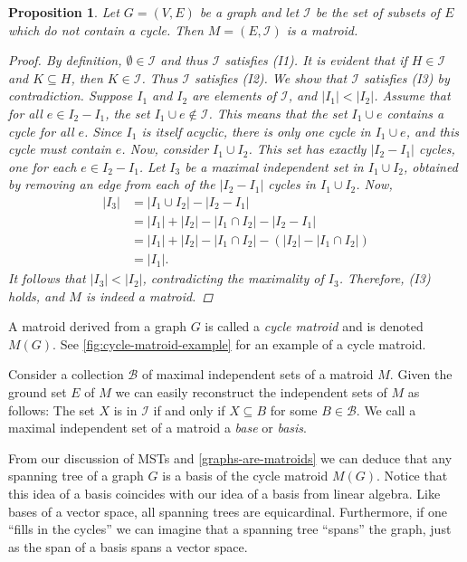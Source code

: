 \documentclass[a4paper,11pt]{report}
\theoremstyle{plain}
\newtheorem{prp}[prp]{Proposition}
\theoremstyle{definition}
\newcommand{\I}{\mathcal{I}}
\newcommand{\B}{\mathscr{B}}
\begin{document}
\begin{prp}\label{graphs-are-matroids}
Let $G = (V,E)$ be a graph and let $\I$ be the set of subsets of $E$ which
do not contain a cycle. Then $M = (E,\I)$ is a matroid.

\begin{proof}
By definition, $\emptyset \in \I$ and thus $\I$ satisfies (I1). It is evident
that if $H \in \I$ and $K \subseteq H$, then $K \in \I$. Thus $\I$ satisfies
(I2). We show that $\I$ satisfies (I3) by contradiction. Suppose $I_1$ and
$I_2$ are elements of $\I$, and $|I_1| < |I_2|$. Assume that for all $e \in
I_2 - I_1$, the set $I_1 \cup e \not\in \I$. This means that the set $I_1
\cup e$ contains a cycle for all $e$. Since $I_1$ is itself acyclic, there
is only one cycle in $I_1 \cup e$, and this cycle must contain $e$. Now,
consider $I_1 \cup I_2$. This set has exactly $|I_2 - I_1|$ cycles, one for
each $e \in I_2 - I_1$. Let $I_3$ be a maximal independent set in
$I_1 \cup I_2$, obtained by removing an edge from each of the $|I_2 - I_1|$
cycles in $I_1 \cup I_2$. Now,
\begin{align*}
    |I_3| &= |I_1 \cup I_2| - |I_2 - I_1|\\
    &= |I_1| + |I_2| - |I_1 \cap I_2| - |I_2 - I_1|\\
    &= |I_1| + |I_2| - |I_1 \cap I_2| - (|I_2| - |I_1 \cap I_2|)\\
    &= |I_1|.
\end{align*}
It follows that $|I_3| < |I_2|$, contradicting the maximality of $I_3$.
Therefore, (I3) holds, and $M$ is indeed a matroid.
\end{proof}
\end{prp}

A matroid derived from a graph $G$ is called a \emph{cycle matroid} and is
denoted $M(G)$. See \autoref{fig:cycle-matroid-example} for an example of a
cycle matroid.



Consider a collection $\B$ of maximal independent sets of a matroid $M$.
Given the ground set $E$ of $M$ we can easily reconstruct the independent
sets of $M$ as follows: The set $X$ is in $\I$ if and only if $X \subseteq
B$ for some $B \in \B$. We call a maximal independent set of a matroid a
\emph{base} or \emph{basis}.

From our discussion of MSTs and \autoref{graphs-are-matroids} we can deduce
that any spanning tree of a graph $G$ is a basis of the cycle matroid $M(G)$.
Notice that this idea of a basis coincides with our idea of a basis from linear
algebra. Like bases of a vector space, all spanning trees are equicardinal.
Furthermore, if one ``fills in the cycles'' we can imagine that a spanning tree
``spans'' the graph, just as the span of a basis spans a vector space.
\end{document}
